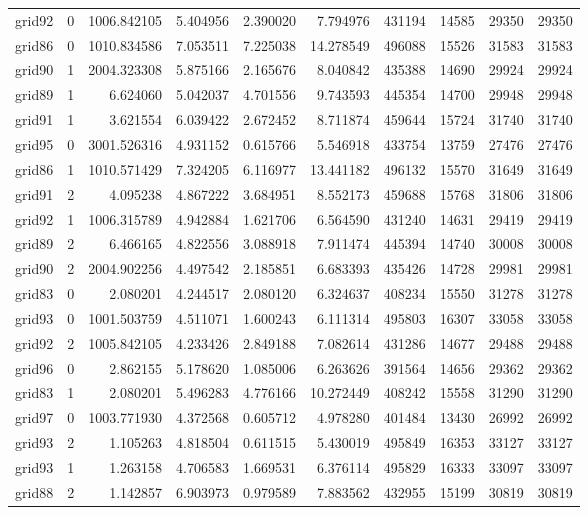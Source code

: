 \begin{longtable}{|l|r|r|r|r|r|r|r|r|r|}
grid92 & 0 & 1006.842105 & 5.404956 & 2.390020 & 7.794976 & 431194 & 14585 & 29350 & 29350 \\
grid86 & 0 & 1010.834586 & 7.053511 & 7.225038 & 14.278549 & 496088 & 15526 & 31583 & 31583 \\
grid90 & 1 & 2004.323308 & 5.875166 & 2.165676 & 8.040842 & 435388 & 14690 & 29924 & 29924 \\
grid89 & 1 & 6.624060 & 5.042037 & 4.701556 & 9.743593 & 445354 & 14700 & 29948 & 29948 \\
grid91 & 1 & 3.621554 & 6.039422 & 2.672452 & 8.711874 & 459644 & 15724 & 31740 & 31740 \\
grid95 & 0 & 3001.526316 & 4.931152 & 0.615766 & 5.546918 & 433754 & 13759 & 27476 & 27476 \\
grid86 & 1 & 1010.571429 & 7.324205 & 6.116977 & 13.441182 & 496132 & 15570 & 31649 & 31649 \\
grid91 & 2 & 4.095238 & 4.867222 & 3.684951 & 8.552173 & 459688 & 15768 & 31806 & 31806 \\
grid92 & 1 & 1006.315789 & 4.942884 & 1.621706 & 6.564590 & 431240 & 14631 & 29419 & 29419 \\
grid89 & 2 & 6.466165 & 4.822556 & 3.088918 & 7.911474 & 445394 & 14740 & 30008 & 30008 \\
grid90 & 2 & 2004.902256 & 4.497542 & 2.185851 & 6.683393 & 435426 & 14728 & 29981 & 29981 \\
grid83 & 0 & 2.080201 & 4.244517 & 2.080120 & 6.324637 & 408234 & 15550 & 31278 & 31278 \\
grid93 & 0 & 1001.503759 & 4.511071 & 1.600243 & 6.111314 & 495803 & 16307 & 33058 & 33058 \\
grid92 & 2 & 1005.842105 & 4.233426 & 2.849188 & 7.082614 & 431286 & 14677 & 29488 & 29488 \\
grid96 & 0 & 2.862155 & 5.178620 & 1.085006 & 6.263626 & 391564 & 14656 & 29362 & 29362 \\
grid83 & 1 & 2.080201 & 5.496283 & 4.776166 & 10.272449 & 408242 & 15558 & 31290 & 31290 \\
grid97 & 0 & 1003.771930 & 4.372568 & 0.605712 & 4.978280 & 401484 & 13430 & 26992 & 26992 \\
grid93 & 2 & 1.105263 & 4.818504 & 0.611515 & 5.430019 & 495849 & 16353 & 33127 & 33127 \\
grid93 & 1 & 1.263158 & 4.706583 & 1.669531 & 6.376114 & 495829 & 16333 & 33097 & 33097 \\
grid88 & 2 & 1.142857 & 6.903973 & 0.979589 & 7.883562 & 432955 & 15199 & 30819 & 30819 \\

\end{longtable}
